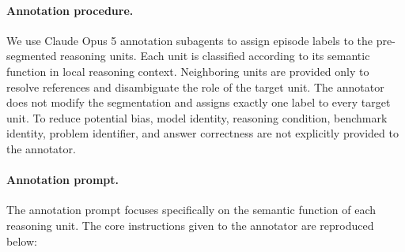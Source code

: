 \paragraph{Annotation procedure.}
We use Claude Opus 5 annotation subagents to assign episode labels to the
pre-segmented reasoning units. Each unit is classified according to its
semantic function in local reasoning context. Neighboring units are provided
only to resolve references and disambiguate the role of the target unit.
The annotator does not modify the segmentation and assigns exactly one label
to every target unit. To reduce potential bias, model identity, reasoning condition, benchmark
identity, problem identifier, and answer correctness are not explicitly
provided to the annotator.

\paragraph{Annotation prompt.}
The annotation prompt focuses specifically on the semantic function of each
reasoning unit. The core instructions given to the annotator are reproduced
below:


